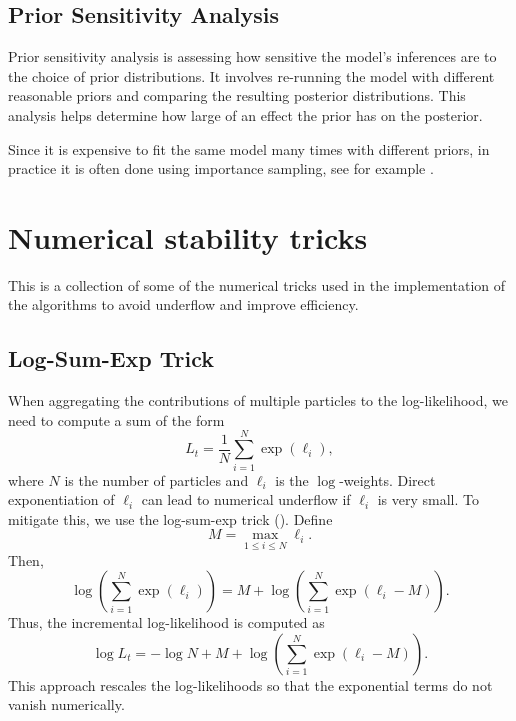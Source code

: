 \section*{Prior Sensitivity Analysis}
Prior sensitivity analysis is assessing how sensitive the model’s inferences are to the choice of prior distributions. It involves re-running the model with different reasonable priors and comparing the resulting posterior distributions. This analysis helps determine how large of an effect the prior has on the posterior.

Since it is expensive to fit the same model many times with different priors, in practice it is often done using importance sampling, see for example \cite{vehtari2024paretosmoothedimportancesampling}.

\chapter{Numerical stability tricks}
\label{chap:NumericalTricks}
This is a collection of some of the numerical tricks used in the implementation of the algorithms to avoid underflow and improve efficiency. 

\section*{Log-Sum-Exp Trick}
When aggregating the contributions of multiple particles to the log-likelihood, we need to compute a sum of the form
\[
	L_t = \frac{1}{N}\sum_{i=1}^N \exp(\ell_i),
\]
where \(N\) is the number of particles and $\ell_i$ is the $\log$-weights. Direct exponentiation of \(\ell_i\) can lead to numerical underflow if \(\ell_i\) is very small. To mitigate this, we use the log-sum-exp trick (\cite{Stan}).
Define
\[
	M = \max_{1 \le i \le N} \ell_i.
\]
Then,
\[
	\log\left(\sum_{i=1}^N \exp(\ell_i)\right) = M + \log\left(\sum_{i=1}^N \exp(\ell_i - M)\right).
\]
Thus, the incremental log-likelihood is computed as
\[
\log L_t = -\log N + M + \log\left(\sum_{i=1}^N \exp(\ell_i - M)\right).
\]
This approach rescales the log-likelihoods so that the exponential terms do not vanish numerically.

